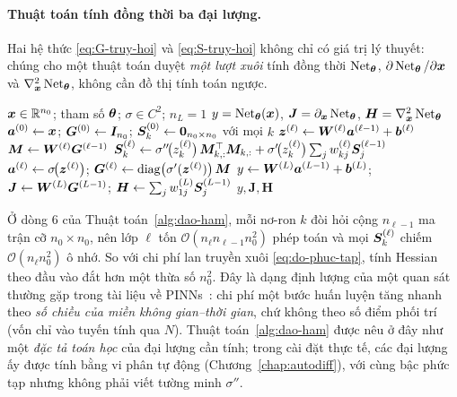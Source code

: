 \paragraph{Thuật toán tính đồng thời ba đại lượng.}
Hai hệ thức \eqref{eq:G-truy-hoi} và \eqref{eq:S-truy-hoi} không chỉ có giá trị
lý thuyết: chúng cho một thuật toán duyệt \emph{một lượt xuôi} tính đồng thời
$\Net_{\btheta}$, $\partial\operatorname{Net}_{\bm{\theta}}/\partial\bm{x}$ và
$\nabla^2_{\bx}\Net_{\btheta}$, không cần đồ thị tính toán ngược.
 
\begin{algorithm}[H]
\caption{Tính đồng thời $\Net_{\btheta}$, $\partial_{\bx}\Net_{\btheta}$ và
$\nabla^2_{\bx}\Net_{\btheta}$ bằng truy hồi xuôi}
\label{alg:dao-ham}
\begin{algorithmic}[1]
\Require $\bm{x} \in \mathbb{R}^{n_0}$; tham số $\bm{\theta}$; $\sigma \in C^2$; $n_L = 1$
\Ensure $y = \operatorname{Net}_{\bm{\theta}}(\bm{x})$, $\bm{J} = \partial_{\bm{x}}\operatorname{Net}_{\bm{\theta}}$,
  $\bm{H} = \nabla^2_{\bm{x}}\operatorname{Net}_{\bm{\theta}}$
\State $\bm{a}^{(0)} \gets \bm{x}$; \; $\bm{G}^{(0)} \gets \bm{I}_{n_0}$; \;
  $\bm{S}^{(0)}_k \gets \bm{0}_{n_0\times n_0}$ với mọi $k$
  \State $\bm{z}^{(\ell)} \gets \bm{W}^{(\ell)}\bm{a}^{(\ell-1)} + \bm{b}^{(\ell)}$
  \State $\bm{M} \gets \bm{W}^{(\ell)}\bm{G}^{(\ell-1)}$
    \State $\bm{S}^{(\ell)}_k \gets
      \sigma''\!\big(z^{(\ell)}_k\big)\,\bm{M}_{k,:}^{\top}\bm{M}_{k,:}
      + \sigma'\!\big(z^{(\ell)}_k\big)
        \sum_{j} w^{(\ell)}_{kj}\bm{S}^{(\ell-1)}_j$
      \Comment{\eqref{eq:S-truy-hoi}}
  \EndFor
  \State $\bm{a}^{(\ell)} \gets \sigma\!\big(\bm{z}^{(\ell)}\big)$; \;
    $\bm{G}^{(\ell)} \gets \operatorname{diag}\!\big(\sigma'(\bm{z}^{(\ell)})\big)\,\bm{M}$
    \Comment{\eqref{eq:G-truy-hoi}}
\EndFor
\State $y \gets \bm{W}^{(L)}\bm{a}^{(L-1)} + \bm{b}^{(L)}$; \;
  $\bm{J} \gets \bm{W}^{(L)}\bm{G}^{(L-1)}$; \;
  $\bm{H} \gets \sum_{j} w^{(L)}_{1j}\bm{S}^{(L-1)}_j$
\State \Return $y, \bm{J}, \bm{H}$
\end{algorithmic}
\end{algorithm}
 
\begin{nhanxet}
\label{nx:chi-phi-hessian}
Ở dòng 6 của Thuật toán~\ref{alg:dao-ham}, mỗi nơ-ron $k$ đòi hỏi cộng
$n_{\ell-1}$ ma trận cỡ $n_0\times n_0$, nên lớp $\ell$ tốn
$\mathcal{O}(n_\ell n_{\ell-1} n_0^2)$ phép toán và mọi $\bm{S}^{(\ell)}_k$ chiếm
$\mathcal{O}(n_\ell n_0^2)$ ô nhớ. So với chi phí lan truyền xuôi
\eqref{eq:do-phuc-tap}, tính Hessian theo đầu vào đắt hơn một thừa số $n_0^2$.
Đây là dạng định lượng của một quan sát thường gặp trong tài liệu về
PINNs~\cite{karniadakis2021}: chi phí một bước huấn luyện tăng nhanh theo
\emph{số chiều của miền không gian--thời gian}, chứ không theo số điểm phối trí
(vốn chỉ vào tuyến tính qua $N$). Thuật toán~\ref{alg:dao-ham} được nêu ở đây
như một \emph{đặc tả toán học} của đại lượng cần tính; trong cài đặt thực tế,
các đại lượng ấy được tính bằng vi phân tự động (Chương~\ref{chap:autodiff}),
với cùng bậc phức tạp nhưng không phải viết tường minh $\sigma''$.
\end{nhanxet}
 
